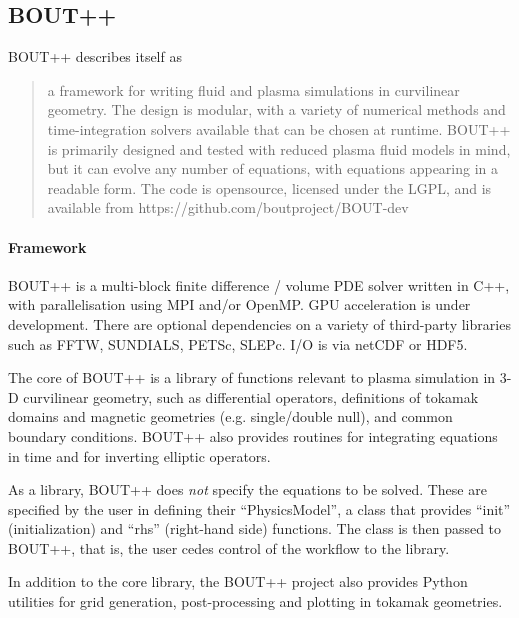 \subsection{BOUT++}\label{sec:bout}


BOUT++ \cite{bout431,boutwebsite,boutrepo} describes itself as
\begin{quote}
a framework for writing fluid and plasma simulations in curvilinear geometry. The design is modular, with a variety of numerical methods and time-integration solvers available that can be chosen at runtime. BOUT++ is primarily designed and tested with reduced plasma fluid models in mind, but it can evolve any number of equations, with equations appearing in a readable form. The code is opensource, licensed under the LGPL, and is available from https://github.com/boutproject/BOUT-dev
\end{quote}

\paragraph{Framework}

BOUT++ is a multi-block finite difference / volume PDE solver written in C++, with parallelisation using MPI and/or OpenMP.
GPU acceleration is under development.
There are optional dependencies on a variety of third-party libraries such as FFTW, SUNDIALS, PETSc, SLEPc. I/O is via netCDF or HDF5. 

The core of BOUT++ is a library of functions relevant to plasma simulation in 3-D curvilinear geometry, such as differential operators, definitions of tokamak domains and magnetic geometries (e.g. single/double null), and common boundary conditions. 
BOUT++ also provides routines for integrating equations in time and for inverting elliptic operators.

As a library, BOUT++ does \emph{not} specify the equations to be solved.
These are specified by the user in defining their ``PhysicsModel'', a class that provides ``init'' (initialization) and ``rhs'' (right-hand side) functions.
The class is then passed to BOUT++, that is, the user cedes control of the workflow to the library.

In addition to the core library, the BOUT++ project also provides Python utilities for grid generation, post-processing and plotting in tokamak geometries.

